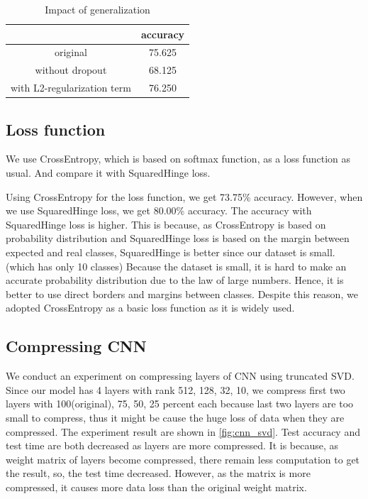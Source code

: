 \begin{table}[htbp]
	\centering
	\setlength{\tabcolsep}{10pt}
	\renewcommand{\arraystretch}{1.5}
	\begin{tabular}{|c||c|}
	\hline
	& accuracy  \\ \hline\hline
	original & 75.625  \\ \hline
	without dropout & 68.125  \\ \hline
	with L2-regularization term & 76.250  \\ \hline
	\end{tabular}
        \caption{Impact of generalization}
	\label{table:generalization}
\end{table}
	

\subsection{Loss function}
We use CrossEntropy, which is based on softmax function, as a loss function as usual. And compare it with SquaredHinge loss.

Using CrossEntropy for the loss function, we get 73.75\% accuracy. However, when we use SquaredHinge loss, we get 80.00\% accuracy. The accuracy with SquaredHinge loss is higher. This is because, as CrossEntropy is based on probability distribution and SquaredHinge loss is based on the margin between expected and real classes, SquaredHinge is better since our dataset is small. (which has only 10 classes) Because the dataset is small, it is hard to make an accurate probability distribution due to the law of large numbers. Hence, it is better to use direct borders and margins between classes.
Despite this reason, we adopted CrossEntropy as a basic loss function as it is widely used.

\subsection{Compressing CNN}
We conduct an experiment on compressing layers of CNN using truncated SVD. Since our model has 4 layers with rank 512, 128, 32, 10, we compress first two layers with 100(original), 75, 50, 25 percent each because last two layers are too small to compress, thus it might be cause the huge loss of data when they are compressed. The experiment result are shown in \cref{fig:cnn_svd}. Test accuracy and test time are both decreased as layers are more compressed. It is because, as weight matrix of layers become compressed, there remain less computation to get the result, so, the test time decreased. However, as the matrix is more compressed, it causes more data loss than the original weight matrix.

